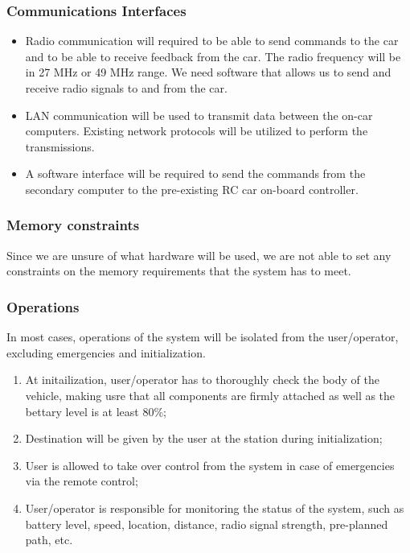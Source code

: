 \documentclass[compsoc,draftclsnofoot,onecolumn,10pt]{IEEEtran}
\begin{document}
\subsubsection{Communications Interfaces} %
\begin{itemize}
	\item Radio communication will required to be able to send commands to the car and
	to be able to receive feedback from the car. The radio frequency will be in 27
	MHz or 49 MHz range. We need software that allows us to send and receive radio
	signals to and from the car. 
	
	\item LAN communication will be used to transmit data between the on-car computers.
	Existing network protocols will be utilized to perform the transmissions.
	
	\item A software interface will be required to send the commands from the
	secondary computer to the pre-existing RC car on-board controller.
	
\end{itemize}


\subsubsection{Memory constraints} %
Since we are unsure of what hardware will be used, we are not able to set any 
constraints on the memory requirements that the system has to meet. 

\subsubsection{Operations} %
In most cases, operations of the system will be isolated from the user/operator,
excluding emergencies and initialization.  
\begin{enumerate}
	\item At initailization, user/operator has to thoroughly check the body of the
	vehicle, making usre that all components are firmly attached as well as the 
	bettary level is at least 80\%;
	\item Destination will be given by the user at the station during initialization;
	\item User is allowed to take over control from the system in case of emergencies
	via the remote control;
	\item User/operator is responsible for monitoring the status of the system, such as 
	battery level, speed, location, distance, radio signal strength, pre-planned path, 
	etc.
\end{enumerate}
\end{document}
